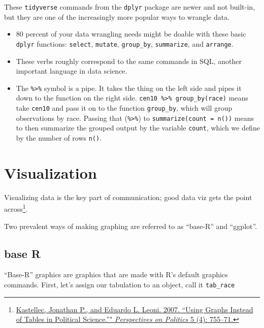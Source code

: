\documentclass[]{book}
\newenvironment{Shaded}{\begin{snugshade}}{\end{snugshade}}
\newcommand{\KeywordTok}[1]{\textcolor[rgb]{0.13,0.29,0.53}{\textbf{#1}}}
\newcommand{\StringTok}[1]{\textcolor[rgb]{0.31,0.60,0.02}{#1}}
\newcommand{\OperatorTok}[1]{\textcolor[rgb]{0.81,0.36,0.00}{\textbf{#1}}}
\newcommand{\NormalTok}[1]{#1}
\providecommand{\tightlist}{%
  \setlength{\itemsep}{0pt}\setlength{\parskip}{0pt}}
\let\rmarkdownfootnote\footnote%
\def\footnote{\protect\rmarkdownfootnote}
\theoremstyle{definition}
\theoremstyle{definition}
\theoremstyle{definition}
\theoremstyle{remark}
\begin{document}
These \texttt{tidyverse} commands from the \texttt{dplyr} package are
newer and not built-in, but they are one of the increasingly more
popular ways to wrangle data.

\begin{itemize}
\tightlist
\item
  80 percent of your data wrangling needs might be doable with these
  basic \texttt{dplyr} functions: \texttt{select}, \texttt{mutate},
  \texttt{group\_by}, \texttt{summarize}, and \texttt{arrange}.
\item
  These verbs roughly correspond to the same commands in SQL, another
  important language in data science.
\item
  The \texttt{\%\textgreater{}\%} symbol is a pipe. It takes the thing
  on the left side and pipes it down to the function on the right side.
  \texttt{cen10\ \%\textgreater{}\%\ group\_by(race)} means take
  \texttt{cen10} and pass it on to the function \texttt{group\_by},
  which will group observations by race. Passing that
  (\texttt{\%\textgreater{}\%}) to \texttt{summarize(count\ =\ n())}
  means to then summarize the grouped output by the variable
  \texttt{count}, which we define by the number of rows \texttt{n()}.
\end{itemize}

\section{Visualization}\label{visualization}

Visualizing data is the key part of communication; good data viz gets
the point across\footnote{\href{http://www.princeton.edu/~jkastell/Tables2Graphs/graphs.pdf}{Kastellec,
  Jonathan P., and Eduardo L. Leoni. 2007. ``Using Graphs Instead of
  Tables in Political Science.''" \emph{Perspectives on Politics} 5 (4):
  755--71.}}.

Two prevalent ways of making graphing are referred to as ``base-R'' and
``ggplot''.

\subsection{base R}\label{base-r}

``Base-R'' graphics are graphics that are made with R's default graphics
commands. First, let's assign our tabulation to an object, call it
\texttt{tab\_race}

\begin{Shaded}
\end{Shaded}
\end{document}
